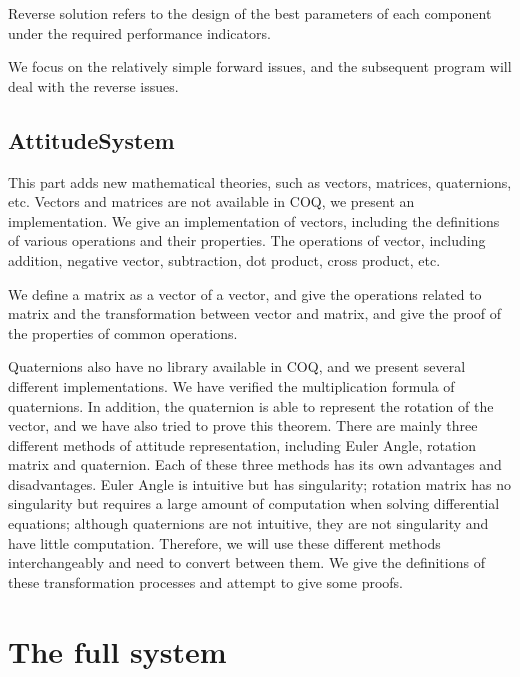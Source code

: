 \documentclass{article} %
\numberwithin{equation}{section} %
\begin{document}
Reverse solution refers to the design of the best parameters of each component under the required performance indicators.

We focus on the relatively simple forward issues, and the subsequent program will deal with the reverse issues.

\subsection{AttitudeSystem}

This part adds new mathematical theories, such as vectors, matrices, quaternions, etc.
Vectors and matrices are not available in COQ, we present an implementation.
We give an implementation of vectors, including the definitions of various operations and their properties.
The operations of vector, including addition, negative vector, subtraction, dot product, cross product, etc.

We define a matrix as a vector of a vector, and give the operations related to matrix and the transformation between vector and matrix, and give the proof of the properties of common operations.

Quaternions also have no library available in COQ, and we present several different implementations.
We have verified the multiplication formula of quaternions.
In addition, the quaternion is able to represent the rotation of the vector, and we have also tried to prove this theorem.
There are mainly three different methods of attitude representation, including Euler Angle, rotation matrix and quaternion.
Each of these three methods has its own advantages and disadvantages. 
Euler Angle is intuitive but has singularity; rotation matrix has no singularity but requires a large amount of computation when solving differential equations; although quaternions are not intuitive, they are not  singularity and have little computation.
Therefore, we will use these different methods interchangeably and need to convert between them.
We give the definitions of these transformation processes and attempt to give some proofs.


\section{The full system}



\end{document}
